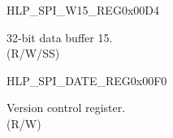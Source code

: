 \begin{register}{H}{LP\_SPI\_W15\_REG}{0x00D4}\label{regdesc:LPSPIW15REG}
%
\regnewline%
\begin{regdesc}\begin{reglist}
\label{fielddesc:LPSPIBUF15}\item [LP\_SPI\_BUF15] 32-bit data buffer 15.\\
(R/W/SS)
\end{reglist}\end{regdesc}
\end{register}


\begin{register}{H}{LP\_SPI\_DATE\_REG}{0x00F0}\label{regdesc:LPSPIDATEREG}
%
%
\regnewline%
\begin{regdesc}\begin{reglist}
\label{fielddesc:LPSPIDATE}\item [LP\_SPI\_DATE] Version control register. \\
(R/W)
\end{reglist}\end{regdesc}
\end{register}


